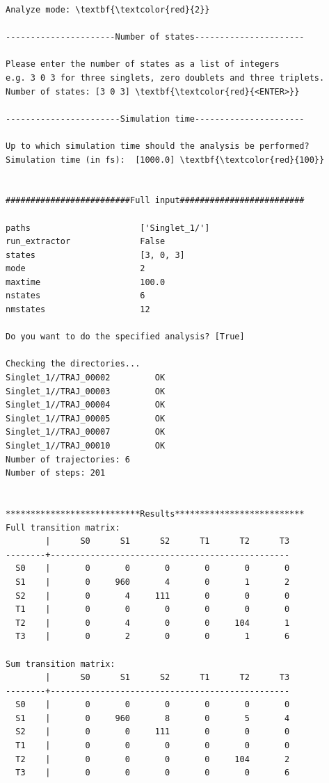 \documentclass[a4paper,11pt,DIV=15,openany]{scrbook}
\begin{document}
\begin{oframed}
\begin{Verbatim}[commandchars=\\\{\}]
Analyze mode: \textbf{\textcolor{red}{2}}

----------------------Number of states----------------------

Please enter the number of states as a list of integers
e.g. 3 0 3 for three singlets, zero doublets and three triplets.
Number of states: [3 0 3] \textbf{\textcolor{red}{<ENTER>}}

-----------------------Simulation time----------------------

Up to which simulation time should the analysis be performed?
Simulation time (in fs):  [1000.0] \textbf{\textcolor{red}{100}}


#########################Full input#########################

paths                      ['Singlet_1/']
run_extractor              False
states                     [3, 0, 3]
mode                       2
maxtime                    100.0
nstates                    6
nmstates                   12

Do you want to do the specified analysis? [True] 

Checking the directories...
Singlet_1//TRAJ_00002         OK
Singlet_1//TRAJ_00003         OK
Singlet_1//TRAJ_00004         OK
Singlet_1//TRAJ_00005         OK
Singlet_1//TRAJ_00007         OK
Singlet_1//TRAJ_00010         OK
Number of trajectories: 6
Number of steps: 201


***************************Results**************************
Full transition matrix:
        |      S0      S1      S2      T1      T2      T3
--------+------------------------------------------------
  S0    |       0       0       0       0       0       0
  S1    |       0     960       4       0       1       2
  S2    |       0       4     111       0       0       0
  T1    |       0       0       0       0       0       0
  T2    |       0       4       0       0     104       1
  T3    |       0       2       0       0       1       6

Sum transition matrix:
        |      S0      S1      S2      T1      T2      T3
--------+------------------------------------------------
  S0    |       0       0       0       0       0       0
  S1    |       0     960       8       0       5       4
  S2    |       0       0     111       0       0       0
  T1    |       0       0       0       0       0       0
  T2    |       0       0       0       0     104       2
  T3    |       0       0       0       0       0       6


\end{Verbatim}
\end{oframed}
\end{document}
